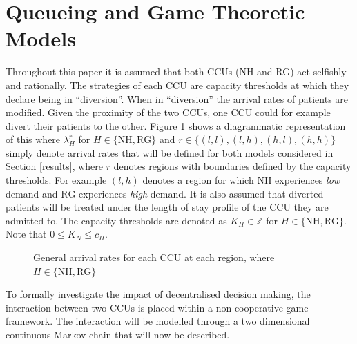 \documentclass{article}
\newcommand{\NH}{\text{NH}}
\newcommand{\RG}{\text{RG}}
\begin{document}
\section{Queueing and Game Theoretic Models} \label{queueingandgamemodels}

Throughout this paper it is assumed that both CCUs (NH and RG) act selfishly and rationally.
The strategies of each CCU are capacity thresholds at which they declare being in ``diversion''. When in ``diversion'' the arrival rates of patients are modified.
Given the proximity of the two CCUs, one CCU could for example divert their patients to the other.
Figure \ref{arrivalrateregions} shows a diagrammatic representation of this where $\lambda_H^{r}$ for $H\in\{\NH, \RG\}$ and $r\in\{(l,l), (l,h), (h,l), (h,h)\}$ simply denote arrival rates that will be defined for both models considered in Section \ref{results}, where $r$ denotes regions with boundaries defined by the capacity thresholds.
For example $(l,h)$ denotes a region for which $\NH$ experiences \textit{low} demand and $\RG$ experiences \textit{high} demand.
It is also assumed that diverted patients will be treated under the length of stay profile of the CCU they are admitted to.
The capacity thresholds are denoted as $K_{H}\in\mathbb{Z}$ for $H\in\{\NH,\RG\}$. Note that $0\leq K_N\leq c_H$.

\begin{figure}[!htbp]
\begin{center}
\caption{General arrival rates for each CCU at each region, where $H\in\{\NH, \RG\}$} \label{arrivalrateregions}
\end{center}
\end{figure}

To formally investigate the impact of decentralised decision making, the interaction between two CCUs is placed within a non-cooperative game framework.
The interaction will be modelled through a two dimensional continuous Markov chain that will now be described.
\end{document}
